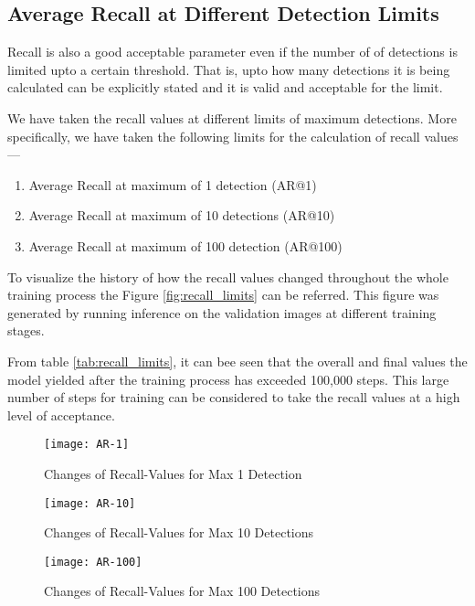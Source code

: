         \subsection{Average Recall at Different Detection Limits}
            Recall is also a good acceptable parameter even if the number of of detections is limited upto a certain threshold\cite{wiki:precision_recall}. That is, upto how many detections it is being calculated can be explicitly stated and it is valid and acceptable for the limit.
            
            \vspace{5mm}
            We have taken the recall values at different limits of maximum detections. More specifically, we have taken the following limits for the calculation of recall values---
            \begin{enumerate}
                \item {Average Recall at maximum of 1 detection (AR@1)}
                \item {Average Recall at maximum of 10 detections (AR@10)}
                \item {Average Recall at maximum of 100 detection (AR@100)}
            \end{enumerate}
            
            \vspace{5mm}
            To visualize the history of how the recall values changed throughout the whole training process the Figure \ref{fig:recall_limits} can be referred. This figure was generated by running inference on the validation images at different training stages.
            
            \vspace{5mm}
            From table \ref{tab:recall_limits}, it can bee seen that the overall and final values the model yielded after the training process has exceeded 100,000 steps. This large number of steps for training can be considered to take the recall values at a high level of acceptance.
            
            \clearpage
            \begin{figure}
                \centering
                \texttt{[image: AR-1]}
                \caption{Changes of Recall-Values for Max 1 Detection}
                \label{fig:recall_limits_1}
            \end{figure}
            \begin{figure}
                \centering
                \texttt{[image: AR-10]}
                \caption{Changes of Recall-Values for Max 10 Detections}
                \label{fig:recall_limits_10}
            \end{figure}
            \begin{figure}
                \centering
                \texttt{[image: AR-100]}
                \caption{Changes of Recall-Values for Max 100 Detections}
                \label{fig:recall_limits_100}
            \end{figure}
            
